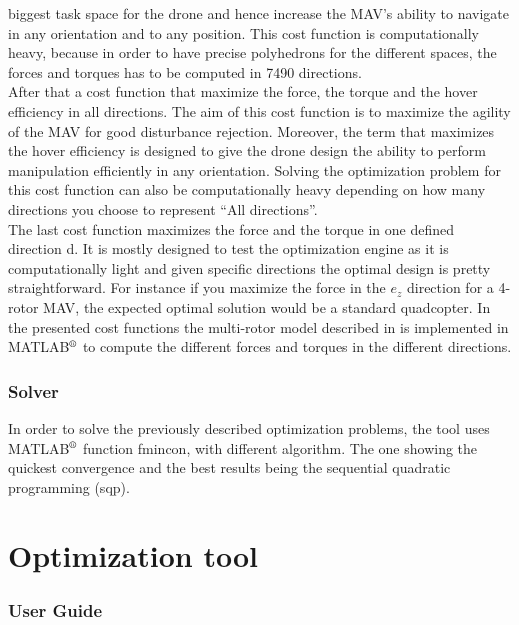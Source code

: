 biggest task space for the drone and hence increase the MAV’s ability to navigate
in any orientation and to any
position. This cost function is computationally heavy, because in order to have
precise polyhedrons for the different spaces, the forces and torques has to be
computed in 7490 directions.\\
After that a cost function that maximize the force, the torque and the hover
efficiency in all directions. The aim of this cost function
is to maximize the agility of the MAV for good disturbance rejection. Moreover,
the term that maximizes the hover efficiency is designed to give the drone design
the ability to perform manipulation efficiently in any orientation. Solving the
optimization problem for this cost function can also be computationally heavy
depending on how many directions you choose to represent “All directions”.\\
The last cost function maximizes the force and the torque in one defined
direction d. It is mostly designed to test the optimization engine as it is
computationally light and given specific directions the optimal design is
pretty straightforward. For instance if you maximize the force in the $e_z$
direction for a 4-rotor MAV, the expected optimal solution would be a standard
quadcopter.
In the presented cost functions the multi-rotor model described in
 is implemented in MATLAB$^\textrm{\textregistered}$
to compute the different forces and torques in the different directions.

\subsubsection{Solver}
\label{sec:solver}
In order to solve the previously described optimization problems, the tool uses
MATLAB$^\textrm{\textregistered}$ function fmincon, with different algorithm.
The one showing the quickest convergence and the best results being the sequential quadratic programming (sqp).

\section{Optimization tool}
\label{sec:optimization_tool}

\subsubsection{User Guide}
\label{sec:user_guide}


